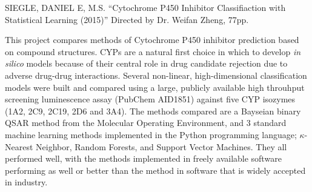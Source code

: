 SIEGLE, DANIEL E, M.S.
``Cytochrome P450 Inhibitor Classifiaction with Statistical Learning (2015)'' Directed by Dr. Weifan Zheng, 77pp.




This project compares methods of Cytochrome P450 inhibitor prediction based on compound structures. CYPs are a natural first choice in which to  develop \textit{in silico} models because of their central role in drug candidate rejection due to adverse drug-drug interactions. Several non-linear, high-dimensional classification models were built and compared using a large, publicly available high throuhput screening luminescence assay (PubChem AID1851) against five CYP isozymes (1A2, 2C9, 2C19, 2D6 and 3A4). The methods compared are a Bayseian binary QSAR method from the Molecular Operating Environment, and 3 standard machine learning methods implemented in the Python programming language; $\kappa$-Nearest Neighbor, Random Forests, and Support Vector Machines. They all performed well, with the methods implemented in freely available software performing as well or better than the method in software that is widely accepted in industry. 